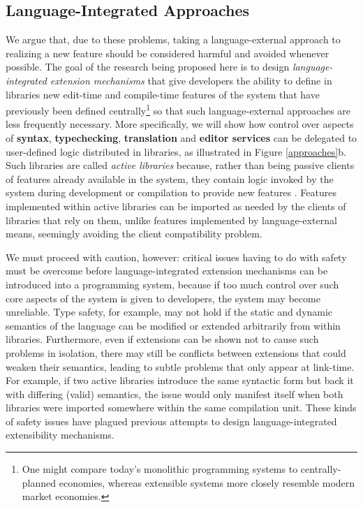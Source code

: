 \subsection{Language-Integrated Approaches}
We argue that, due to these problems, taking a language-external approach to realizing a new feature should be considered harmful and avoided whenever possible. The goal of the research being proposed here is to design \emph{language-integrated extension mechanisms} that give developers the ability to define in libraries new edit-time and compile-time features of the system that have previously been defined centrally\footnote{One might compare today's monolithic programming systems to  {centrally-planned} economies, whereas extensible\- systems more closely resemble modern market economies.} so that such language-external approaches are less frequently necessary. More specifically, we will show how control over aspects of \textbf{syntax}, \textbf{typechecking}, \textbf{translation} and \textbf{editor services} can be delegated to user-defined logic distributed in {libraries}, as illustrated in Figure \ref{approaches}b. 
Such libraries are called \emph{active libraries} because, rather than being passive clients of features already available in the system, they contain logic invoked by the system during development or compilation to provide new features  \cite{activelibraries}. Features implemented within active libraries can be imported as needed by the clients of libraries that rely on them, unlike features implemented by language-external means, seemingly avoiding the client compatibility problem.

We must proceed with caution, however: critical issues having to do with {safety} must be overcome before language-integrated extension mechanisms can be introduced into a programming system, because if too much control over such core aspects of the system is given  to developers, the system may become unreliable. 
Type safety, for example, may not hold if the static and dynamic semantics of the language can be modified or extended arbitrarily from within libraries. Furthermore, even if extensions can be shown not to cause such problems in isolation, there may still be conflicts between extensions that could weaken their semantics, leading to subtle problems that only appear at link-time. For example, if two active libraries introduce the same syntactic form but back it with differing (valid) semantics, the issue would only manifest itself when both libraries were imported somewhere within the same compilation unit. These kinds of safety issues have plagued previous attempts to design language-integrated extensibility mechanisms.%


